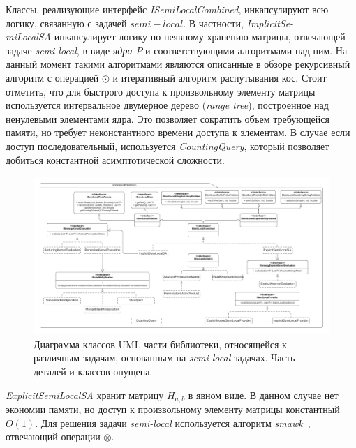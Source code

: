 Классы, реализующие интерфейс \emph{ISemiLocalCombined}, инкапсулируют всю логику, связанную с задачей $semi-local$.
В частности, \emph{ImplicitSe-\\miLocalSA} инкапсулирует логику по неявному хранению матрицы, отвечающей задаче \emph{semi-local}, в виде \emph{ядра $P$} и соответствующими алгоритмами над ним.
На данный момент такими алгоритмами являются описанные в обзоре рекурсивный алгоритм с операцией $\odot$ и итеративный алгоритм распутывания кос.
Стоит отметить, что для быстрого доступа к произвольному элементу матрицы  используется интервальное двумерное дерево (\emph{range tree}), построенное над ненулевыми элементами ядра.
Это позволяет сократить объем требующейся памяти, но требует неконстантного времени доступа к элементам.
В случае если доступ последовательный, используется  \emph{CountingQuery}, который позволяет добиться константной асимптотической сложности.

\begin{figure}
    \includegraphics[height=0.72\columnwidth,angle=90]{figures/Library.png}
    \caption{Диаграмма классов UML части библиотеки, относящейся к различным задачам, основанным на  \emph{semi-local} задачах. Часть деталей и классов опущена.}\label{fig:libraryProblem}
\end{figure}

\emph{ExplicitSemiLocalSA} хранит матрицу $H_{a,b}$ в явном виде.
В данном случае нет экономии памяти, но доступ к произвольному элементу матрицы константный $O(1)$. 
Для решения задачи \emph{semi-local} используется алгоритм \emph{smawk}~\cite{aggarwal1987geometric}, отвечающий операции  $\otimes$.

